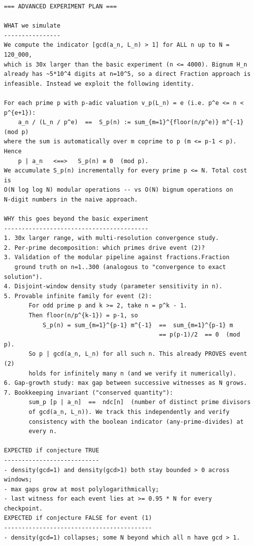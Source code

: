 \documentclass[11pt]{article}
\begin{document}
\begin{lstlisting}
=== ADVANCED EXPERIMENT PLAN ===

WHAT we simulate
----------------
We compute the indicator [gcd(a_n, L_n) > 1] for ALL n up to N = 120_000,
which is 30x larger than the basic experiment (n <= 4000). Bignum H_n
already has ~5*10^4 digits at n=10^5, so a direct Fraction approach is
infeasible. Instead we exploit the following identity.

For each prime p with p-adic valuation v_p(L_n) = e (i.e. p^e <= n < p^{e+1}):
    a_n / (L_n / p^e)  ==  S_p(n) := sum_{m=1}^{floor(n/p^e)} m^{-1}  (mod p)
where the sum is automatically over m coprime to p (m <= p-1 < p).
Hence
    p | a_n   <==>   S_p(n) ≡ 0  (mod p).
We accumulate S_p(n) incrementally for every prime p <= N. Total cost is
O(N log log N) modular operations -- vs O(N) bignum operations on
N-digit numbers in the naive approach.

WHY this goes beyond the basic experiment
-----------------------------------------
1. 30x larger range, with multi-resolution convergence study.
2. Per-prime decomposition: which primes drive event (2)?
3. Validation of the modular pipeline against fractions.Fraction
   ground truth on n=1..300 (analogous to "convergence to exact solution").
4. Disjoint-window density study (parameter sensitivity in n).
5. Provable infinite family for event (2):
       For odd prime p and k >= 2, take n = p^k - 1.
       Then floor(n/p^{k-1}) = p-1, so
           S_p(n) = sum_{m=1}^{p-1} m^{-1}  ==  sum_{m=1}^{p-1} m
                                            == p(p-1)/2  == 0  (mod p).
       So p | gcd(a_n, L_n) for all such n. This already PROVES event (2)
       holds for infinitely many n (and we verify it numerically).
6. Gap-growth study: max gap between successive witnesses as N grows.
7. Bookkeeping invariant ("conserved quantity"):
       sum_p [p | a_n]  ==  ndc[n]  (number of distinct prime divisors
       of gcd(a_n, L_n)). We track this independently and verify
       consistency with the boolean indicator (any-prime-divides) at
       every n.

EXPECTED if conjecture TRUE
---------------------------
- density(gcd=1) and density(gcd>1) both stay bounded > 0 across windows;
- max gaps grow at most polylogarithmically;
- last witness for each event lies at >= 0.95 * N for every checkpoint.
EXPECTED if conjecture FALSE for event (1)
------------------------------------------
- density(gcd=1) collapses; some N beyond which all n have gcd > 1.


\end{lstlisting}
\end{document}
